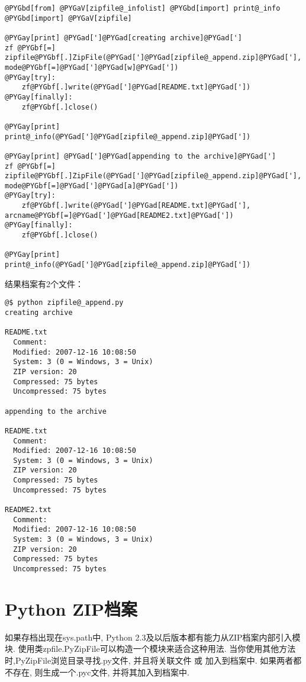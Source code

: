 \documentclass[a4paper,10pt,english]{manual}
\begin{document}
\begin{Verbatim}[commandchars=@\[\]]
@PYGbd[from] @PYGaV[zipfile@_infolist] @PYGbd[import] print@_info
@PYGbd[import] @PYGaV[zipfile]

@PYGay[print] @PYGad[']@PYGad[creating archive]@PYGad[']
zf @PYGbf[=] zipfile@PYGbf[.]ZipFile(@PYGad[']@PYGad[zipfile@_append.zip]@PYGad['], mode@PYGbf[=]@PYGad[']@PYGad[w]@PYGad['])
@PYGay[try]:
    zf@PYGbf[.]write(@PYGad[']@PYGad[README.txt]@PYGad['])
@PYGay[finally]:
    zf@PYGbf[.]close()

@PYGay[print]
print@_info(@PYGad[']@PYGad[zipfile@_append.zip]@PYGad['])

@PYGay[print] @PYGad[']@PYGad[appending to the archive]@PYGad[']
zf @PYGbf[=] zipfile@PYGbf[.]ZipFile(@PYGad[']@PYGad[zipfile@_append.zip]@PYGad['], mode@PYGbf[=]@PYGad[']@PYGad[a]@PYGad['])
@PYGay[try]:
    zf@PYGbf[.]write(@PYGad[']@PYGad[README.txt]@PYGad['], arcname@PYGbf[=]@PYGad[']@PYGad[README2.txt]@PYGad['])
@PYGay[finally]:
    zf@PYGbf[.]close()

@PYGay[print]
print@_info(@PYGad[']@PYGad[zipfile@_append.zip]@PYGad['])
\end{Verbatim}

结果档案有2个文件：

\begin{Verbatim}[commandchars=@\[\]]
@$ python zipfile@_append.py
creating archive

README.txt
  Comment:
  Modified: 2007-12-16 10:08:50
  System: 3 (0 = Windows, 3 = Unix)
  ZIP version: 20
  Compressed: 75 bytes
  Uncompressed: 75 bytes

appending to the archive

README.txt
  Comment:
  Modified: 2007-12-16 10:08:50
  System: 3 (0 = Windows, 3 = Unix)
  ZIP version: 20
  Compressed: 75 bytes
  Uncompressed: 75 bytes

README2.txt
  Comment:
  Modified: 2007-12-16 10:08:50
  System: 3 (0 = Windows, 3 = Unix)
  ZIP version: 20
  Compressed: 75 bytes
  Uncompressed: 75 bytes
\end{Verbatim}


\section{Python ZIP档案}

如果存档出现在sys.path中, Python 2.3及以后版本都有能力从ZIP档案内部引入模块. 使用类zpfile.PyZipFile可以构造一个模块来适合这种用法. 当你使用其他方法  时,PyZipFile浏览目录寻找.py文件, 并且将关联文件  或  加入到档案中. 如果两者都不存在, 则生成一个.pyc文件, 并将其加入到档案中.
\end{document}

